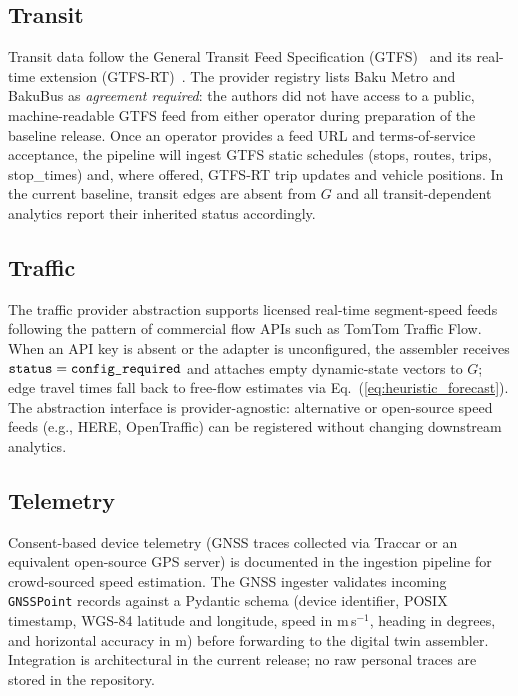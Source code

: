 \subsection{Transit}

Transit data follow the General Transit Feed Specification
(GTFS)~\cite{gtfs_overview} and its real-time extension
(GTFS-RT)~\cite{gtfs_realtime_overview}.
The provider registry lists Baku Metro and BakuBus as
\emph{agreement required}: the authors did not have access to a public,
machine-readable GTFS feed from either operator during preparation of the
baseline release.
Once an operator provides a feed URL and terms-of-service acceptance, the
pipeline will ingest GTFS static schedules (stops, routes, trips,
stop\_times) and, where offered, GTFS-RT trip updates and vehicle positions.
In the current baseline, transit edges are absent from $G$ and all
transit-dependent analytics report their inherited status accordingly.

\subsection{Traffic}

The traffic provider abstraction supports licensed real-time
segment-speed feeds following the pattern of commercial flow APIs such as
TomTom Traffic Flow.
When an API key is absent or the adapter is unconfigured, the assembler
receives $\mathtt{status} = \texttt{config\_required}$ and attaches empty dynamic-state
vectors to $G$; edge travel times fall back to free-flow estimates via
Eq.~(\ref{eq:heuristic_forecast}).
The abstraction interface is provider-agnostic: alternative or open-source
speed feeds (e.g., HERE, OpenTraffic) can be registered without changing
downstream analytics.

\subsection{Telemetry}

Consent-based device telemetry (GNSS traces collected via Traccar or an
equivalent open-source GPS server) is documented in the ingestion pipeline
for crowd-sourced speed estimation.
The GNSS ingester validates incoming \texttt{GNSSPoint} records against a
Pydantic schema (device identifier, POSIX timestamp, WGS-84 latitude and
longitude, speed in m\,s$^{-1}$, heading in degrees, and horizontal
accuracy in m) before forwarding to the digital twin assembler.
Integration is architectural in the current release; no raw personal traces
are stored in the repository.

